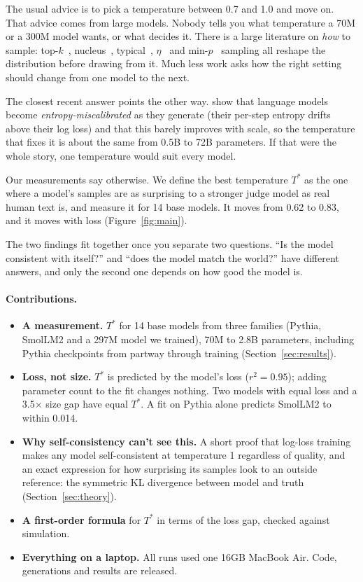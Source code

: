 \documentclass[10pt]{article}
\newcommand{\Ts}{T^{*}}
\begin{document}
The usual advice is to pick a temperature between 0.7 and 1.0 and move on. That advice comes from large models. Nobody tells you what temperature a 70M or a 300M model wants, or what decides it. There is a large literature on \emph{how} to sample: top-$k$~\citep{fan2018hierarchical}, nucleus~\citep{holtzman2020curious}, typical~\citep{meister2023typical}, $\eta$~\citep{hewitt2022truncation} and min-$p$~\citep{nguyen2024minp} sampling all reshape the distribution before drawing from it. Much less work asks how the right setting should change from one model to the next.

The closest recent answer points the other way. \citet{cao2025entropy} show that language models become \emph{entropy-miscalibrated} as they generate (their per-step entropy drifts above their log loss) and that this barely improves with scale, so the temperature that fixes it is about the same from 0.5B to 72B parameters. If that were the whole story, one temperature would suit every model.

Our measurements say otherwise. We define the best temperature $\Ts$ as the one where a model's samples are as surprising to a stronger judge model as real human text is, and measure it for 14 base models. It moves from 0.62 to 0.83, and it moves with loss (Figure~\ref{fig:main}).

The two findings fit together once you separate two questions. ``Is the model consistent with itself?'' and ``does the model match the world?'' have different answers, and only the second one depends on how good the model is.

\paragraph{Contributions.}
\begin{itemize}
    \item \textbf{A measurement.} $\Ts$ for 14 base models from three families (Pythia, SmolLM2 and a 297M model we trained), 70M to 2.8B parameters, including Pythia checkpoints from partway through training (Section~\ref{sec:results}).
    \item \textbf{Loss, not size.} $\Ts$ is predicted by the model's loss ($r^2 = 0.95$); adding parameter count to the fit changes nothing. Two models with equal loss and a 3.5$\times$ size gap have equal $\Ts$. A fit on Pythia alone predicts SmolLM2 to within 0.014.
    \item \textbf{Why self-consistency can't see this.} A short proof that log-loss training makes any model self-consistent at temperature 1 regardless of quality, and an exact expression for how surprising its samples look to an outside reference: the symmetric KL divergence between model and truth (Section~\ref{sec:theory}).
    \item \textbf{A first-order formula} for $\Ts$ in terms of the loss gap, checked against simulation.
    \item \textbf{Everything on a laptop.} All runs used one 16GB MacBook Air. Code, generations and results are released.
\end{itemize}
\end{document}
